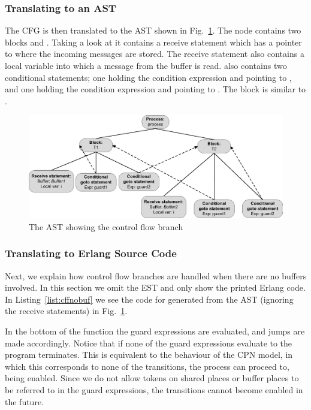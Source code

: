 \subsubsection{Translating to an AST}

The CFG is then translated to the AST shown in Fig.~\ref{fig:cffast}. The  node contains two blocks  and . Taking a look at  it contains a receive statement which has a pointer to  where the incoming messages are stored. The receive statement also contains a local variable  into which a message from the buffer is read.  also contains two conditional statements; one holding the condition expression  and pointing to , and one holding the condition expression  and pointing to . The block  is similar to .

\begin{figure}[b!]
\centering
\includegraphics[scale=0.65]{translation/advancedissues/graphics/cffast.eps}
\caption{The AST showing the control flow branch}
\label{fig:cffast}
\end{figure}

\subsubsection{Translating to Erlang Source Code}
Next, we explain how control flow branches are handled when there are no buffers involved. In this section we omit the EST and only show the printed Erlang code. In Listing~\ref{list:cffnobuf} we see the code for  generated from the AST (ignoring the receive statements) in Fig.~\ref{fig:cffast}.



In the bottom of the function the guard expressions are evaluated, and jumps are made accordingly. Notice that if none of the guard expressions evaluate to  the program terminates. This is equivalent to the behaviour of the CPN model, in which this corresponds to none of the transitions, the process can proceed to, being enabled. Since we do not allow tokens on shared places or buffer places to be referred to in the guard expressions, the transitions cannot become enabled in the future.

